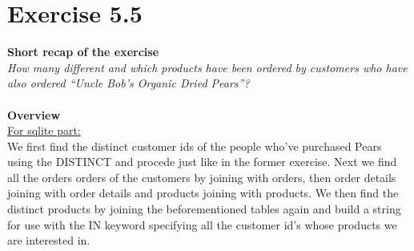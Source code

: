 \documentclass{article}
\begin{document}
\section{Exercise 5.5}
\textbf{Short recap of the exercise}\\
\textit{How many different and which products have been ordered by customers who have also ordered “Uncle Bob’s Organic Dried Pears”?}\\
~\\
\textbf{Overview}\\
\underline{For sqlite part:}~\\
We first find the distinct customer ids of the people who've purchased Pears using the DISTINCT and procede just like in the former exercise.
Next we find all the orders orders of the customers by joining with orders, then order details joining with order details and products joining with products.
We then find the distinct products by joining the beforementioned tables again and
build a string for use with the IN keyword specifying all the customer id's whose products we are interested in.
\end{document}
